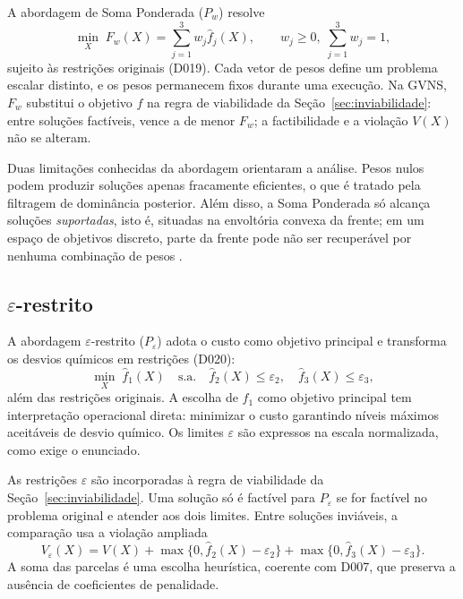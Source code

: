 \documentclass[10pt,twocolumn,a4paper]{article}
\begin{document}
A abordagem de Soma Ponderada ($P_w$) resolve
\begin{equation}
\min_X\; F_w(X) = \sum_{j=1}^{3} w_j \hat f_j(X), \qquad w_j \ge 0,\; \sum_{j=1}^{3} w_j = 1,
\end{equation}
sujeito às restrições originais (D019). Cada vetor de pesos define um problema escalar distinto, e os pesos permanecem fixos durante uma execução. Na GVNS, $F_w$ substitui o objetivo $f$ na regra de viabilidade da Seção~\ref{sec:inviabilidade}: entre soluções factíveis, vence a de menor $F_w$; a factibilidade e a violação $V(X)$ não se alteram.

Duas limitações conhecidas da abordagem orientaram a análise. Pesos nulos podem produzir soluções apenas fracamente eficientes, o que é tratado pela filtragem de dominância posterior. Além disso, a Soma Ponderada só alcança soluções \emph{suportadas}, isto é, situadas na envoltória convexa da frente; em um espaço de objetivos discreto, parte da frente pode não ser recuperável por nenhuma combinação de pesos \cite{aulas_td}.

\subsection{$\varepsilon$-restrito}

A abordagem $\varepsilon$-restrito ($P_\varepsilon$) adota o custo como objetivo principal e transforma os desvios químicos em restrições (D020):
\begin{equation}
\min_X\; \hat f_1(X) \quad \text{s.a.} \quad \hat f_2(X) \le \varepsilon_2, \quad \hat f_3(X) \le \varepsilon_3,
\end{equation}
além das restrições originais. A escolha de $f_1$ como objetivo principal tem interpretação operacional direta: minimizar o custo garantindo níveis máximos aceitáveis de desvio químico. Os limites $\varepsilon$ são expressos na escala normalizada, como exige o enunciado.

As restrições $\varepsilon$ são incorporadas à regra de viabilidade da Seção~\ref{sec:inviabilidade}. Uma solução só é factível para $P_\varepsilon$ se for factível no problema original e atender aos dois limites. Entre soluções inviáveis, a comparação usa a violação ampliada
\begin{equation}
V_\varepsilon(X) = V(X) + \max\{0, \hat f_2(X) - \varepsilon_2\} + \max\{0, \hat f_3(X) - \varepsilon_3\}.
\end{equation}
A soma das parcelas é uma escolha heurística, coerente com D007, que preserva a ausência de coeficientes de penalidade.
\end{document}
